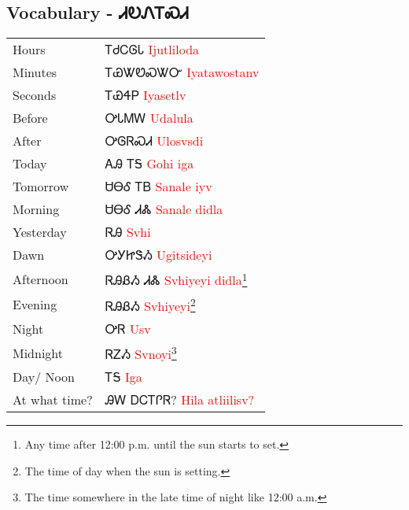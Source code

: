 \subsection{Vocabulary - ᏗᎧᏁᎢᏍᏗ 
}
\begin{minipage}{\linewidth}
\begin{tabular}{p{5cm} p{9cm}}
Hours & ᎢᏧᏟᎶᏓ 
 \newline \textcolor{red}{Ijutliloda}\\
Minutes & ᎢᏯᏔᏬᏍᏔᏅ 
 \newline \textcolor{red}{Iyatawostanv}\\
Seconds & ᎢᏯᏎᏢ 
 \newline \textcolor{red}{Iyasetlv}\\
Before & ᎤᏓᎷᎳ 
 \newline \textcolor{red}{Udalula}\\
After & ᎤᎶᏒᏍᏗ 
 \newline \textcolor{red}{Ulosvsdi}\\
Today & ᎪᎯ ᎢᎦ 
 \newline \textcolor{red}{Gohi iga}\\
Tomorrow & ᏌᎾᎴ ᎢᏴ 
 \newline \textcolor{red}{Sanale iyv}\\
Morning & ᏌᎾᎴ ᏗᏜ 
 \newline \textcolor{red}{Sanale didla}\\
Yesterday & ᏒᎯ 
 \newline \textcolor{red}{Svhi}\\
Dawn & ᎤᎩᏥᏕᏱ 
 \newline \textcolor{red}{Ugitsideyi}\\
Afternoon & ᏒᎯᏰᏱ ᏗᏜ 
 \newline \textcolor{red}{Svhiyeyi didla}\footnote{Any time after 12:00 p.m. until the sun starts to set.}\\
Evening & ᏒᎯᏰᏱ 
 \newline \textcolor{red}{Svhiyeyi}\footnote{The time of day when the sun is setting.}\\
Night & ᎤᏒ 
 \newline \textcolor{red}{Usv}\\
Midnight & ᏒᏃᏱ 
 \newline \textcolor{red}{Svnoyi}\footnote{The time somewhere in the late time of night like 12:00 a.m.}\\
Day/ Noon & ᎢᎦ 
 \newline \textcolor{red}{Iga}\\
At what time? & ᎯᎳ ᎠᏟᎢᎵᏒ? 
 \newline \textcolor{red}{Hila atliilisv?}\\

\end{tabular}
\end{minipage}
